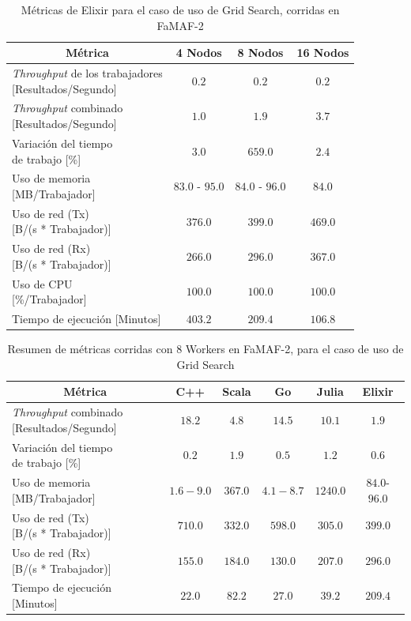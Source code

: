 \documentclass[11pt]{article}
\providecommand{\row}[1]{\parbox{150pt}{\setlength{\baselineskip}{0.2\baselineskip}\strut#1\strut}}
\newcommand{\gscap}[2]{\caption{Métricas de #1 para el caso de uso de Grid Search, corridas en #2}}
\newcommand{\english}[1]{\textit{#1}}
\begin{document}
\begin{table}[H]
\centering
\begin{tabular}{|l|c|c|c|}
\hline
\multicolumn{1}{|c|}{Métrica} & 4 Nodos & 8 Nodos & 16 Nodos \\ \hline
\row{\english{Throughput} de los trabajadores\\{[Resultados/Segundo]}} & $0.2$ & $0.2$ & $0.2$ \\ \hline
\row{\english{Throughput} combinado\\{[Resultados/Segundo]}} & $1.0$ & $1.9$ & $3.7$ \\ \hline
\row{Variación del tiempo\\de trabajo {[\%]}} & $3.0$ & $659.0$ & $2.4$ \\ \hline
\row{Uso de memoria\\{[MB/Trabajador]}} & $83.0$ - $95.0$ & $84.0$ - $96.0$ & $84.0$ \\ \hline
\row{Uso de red (Tx)\\{[B/(s * Trabajador)]}} & $376.0$ & $399.0$ & $469.0$ \\ \hline
\row{Uso de red (Rx)\\{[B/(s * Trabajador)]}} & $266.0$ & $296.0$ & $367.0$ \\ \hline
\row{Uso de CPU\\{[\%/Trabajador]}} & $100.0$ & $100.0$ & $100.0$ \\ \hline
Tiempo de ejecución [Minutos] & $403.2$ & $209.4$ & $106.8$ \\ \hline
\end{tabular}
\gscap{Elixir}{FaMAF-2}
\end{table}



\begin{table}[H]
\centering
\begin{tabular}{|l|c|c|c|c|c|}
\hline
\multicolumn{1}{|c|}{Métrica} & C++ & Scala & Go & Julia & Elixir \\ \hline
\row{\english{Throughput} combinado \\ {[Resultados/Segundo]}} & $18.2$ & $4.8$ & $14.5$ & $10.1$ & $1.9$ \\ \hline
\row{Variación del tiempo \\ de trabajo {[}\%{]}} & $0.2$ & $1.9$ & $0.5$ & $1.2$ & $0.6$ \\ \hline
\row{Uso de memoria \\ {[}MB/Trabajador{]}} & $1.6-9.0$ & $367.0$ & $4.1-8.7$ & $1240.0$ & $84.0$-$96.0$ \\ \hline
\row{Uso de red (Tx)\\ {[}B/(s * Trabajador){]}} & $710.0$ & $332.0$ & $598.0$ & $305.0$ & $399.0$ \\ \hline
\row{Uso de red (Rx)\\ {[}B/(s * Trabajador){]}} & $155.0$ & $184.0$ & $130.0$ & $207.0$ & $296.0$ \\ \hline
Tiempo de ejecución {[}Minutos{]} & $22.0$ & $82.2$ & $27.0$ & $39.2$ & $209.4$ \\ \hline
\end{tabular}
\caption{Resumen de métricas corridas con 8 Workers en FaMAF-2, para el caso de uso de Grid Search}
\label{tab:gs:8_workers_famaf2}
\end{table}
\end{document}
